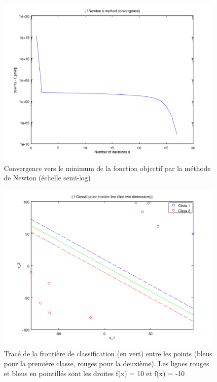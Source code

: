 \documentclass{article}
\begin{document}
         \begin{figure}
           \begin{center}
             \includegraphics[scale=0.5]{images/cvnewton1.png}
             \caption{Convergence vers le minimum de la fonction objectif par la méthode de Newton (échelle semi-log)}
           \end{center}
         \end{figure}

         \begin{figure}
           \begin{center}
             \includegraphics[scale=0.5]{images/line1.png}
             \caption{Tracé de la frontière de classification (en vert) entre les points (bleus pour la première classe, rouges pour la deuxième). Les lignes rouges et bleus en pointillés sont les droites f(x) = 10 et f(x) = -10}
           \end{center}
         \end{figure}
\end{document}
